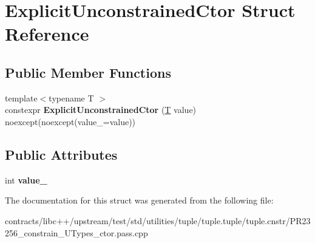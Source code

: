 \hypertarget{struct_explicit_unconstrained_ctor}{}\section{Explicit\+Unconstrained\+Ctor Struct Reference}
\label{struct_explicit_unconstrained_ctor}
\subsection*{Public Member Functions}
\begin{DoxyCompactItemize}
\item 
\mbox{\label{struct_explicit_unconstrained_ctor_a20fd11d25e02c43f31abab35f5112d1c}} 
{\footnotesize template$<$typename T $>$ }\\constexpr {\bfseries Explicit\+Unconstrained\+Ctor} (\mbox{\hyperlink{struct_t}{T}} value) noexcept(noexcept(value\+\_\+=value))
\end{DoxyCompactItemize}
\subsection*{Public Attributes}
\begin{DoxyCompactItemize}
\item 
\mbox{\label{struct_explicit_unconstrained_ctor_ad32632533ad51ef255d55f1eae3d01c6}} 
int {\bfseries value\+\_\+}
\end{DoxyCompactItemize}


The documentation for this struct was generated from the following file\+:\begin{DoxyCompactItemize}
\item 
contracts/libc++/upstream/test/std/utilities/tuple/tuple.\+tuple/tuple.\+cnstr/P\+R23256\+\_\+constrain\+\_\+\+U\+Types\+\_\+ctor.\+pass.\+cpp\end{DoxyCompactItemize}
